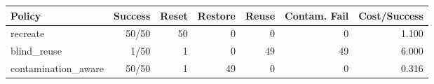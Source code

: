 \begin{tabular}{lrrrrrr}
\toprule
Policy & Success & Reset & Restore & Reuse & Contam. Fail & Cost/Success \\
\midrule
recreate & 50/50 & 50 & 0 & 0 & 0 & 1.100 \\
blind\_reuse & 1/50 & 1 & 0 & 49 & 49 & 6.000 \\
contamination\_aware & 50/50 & 1 & 49 & 0 & 0 & 0.316 \\
\bottomrule
\end{tabular}
